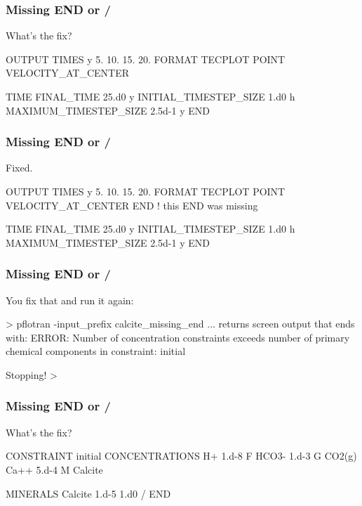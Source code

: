 \documentclass{beamer}
\newcommand\gehcomment[1]{{{\color{orange} #1}}}
\newcommand\redcomment[1]{{{\color{red} #1}}}
\newcommand\bluecomment[1]{{{\color{blue} #1}}}
\newcommand\greencomment[1]{{{\color{green} #1}}}
\newcommand\magentacomment[1]{{{\color{magenta} #1}}}
\begin{document}
\begin{frame}\frametitle{Missing \greencomment{END} or \greencomment{/}}
\redcomment{What's the fix?}
\begin{semiverbatim}

OUTPUT
  TIMES y 5. 10. 15. 20.
  FORMAT TECPLOT POINT
  VELOCITY_AT_CENTER

TIME
  FINAL_TIME 25.d0 y
  INITIAL_TIMESTEP_SIZE 1.d0 h
  MAXIMUM_TIMESTEP_SIZE 2.5d-1 y
END
\end{semiverbatim}

\end{frame}

\begin{frame}\frametitle{Missing \greencomment{END} or \greencomment{/}}
\redcomment{Fixed.}
\begin{semiverbatim}

OUTPUT
  TIMES y 5. 10. 15. 20.
  FORMAT TECPLOT POINT
  VELOCITY_AT_CENTER
\magentacomment{END} \bluecomment{! this \greencomment{END} was missing}

TIME
  FINAL_TIME 25.d0 y
  INITIAL_TIMESTEP_SIZE 1.d0 h
  MAXIMUM_TIMESTEP_SIZE 2.5d-1 y
END
\end{semiverbatim}

\end{frame}

\begin{frame}\frametitle{Missing \greencomment{END} or \greencomment{/}}
\redcomment{You fix that and run it again:}
\begin{semiverbatim}

> pflotran -input_prefix calcite_missing_end
... \gehcomment{returns screen output that ends with:}
  ERROR: Number of concentration constraints exceeds
  number of primary chemical components in constraint:
  initial

  Stopping!
>
\end{semiverbatim}

\end{frame}

\begin{frame}\frametitle{Missing \greencomment{END} or \greencomment{/}}
\redcomment{What's the fix?}
\begin{semiverbatim}

CONSTRAINT initial
  CONCENTRATIONS
    H+     1.d-8      F
    HCO3-  1.d-3      G  CO2(g)
    Ca++   5.d-4      M  Calcite

  MINERALS
    Calcite 1.d-5 1.d0
  /
END
\end{semiverbatim}

\end{frame}
\end{document}
